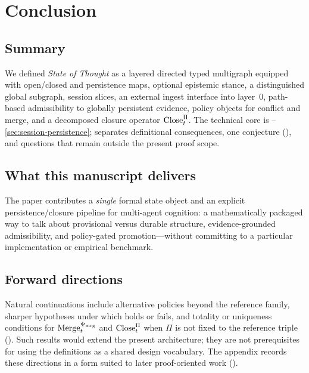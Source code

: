 \section{Conclusion}
\label{sec:conclusion}

\subsection{Summary}
\label{subsec:conc-summary}

We defined \emph{State of Thought} as a layered directed typed multigraph equipped with open/closed and persistence maps, optional epistemic stance, a distinguished global subgraph, session slices, an external ingest interface into layer~$0$, path-based admissibility to globally persistent evidence, policy objects for conflict and merge, and a decomposed closure operator $\mathrm{Close}_t^{\Pi}$.
The technical core is --\ref{sec:session-persistence};  separates definitional consequences, one conjecture (), and questions that remain outside the present proof scope.

\subsection{What this manuscript delivers}
\label{subsec:conc-delivers}

The paper contributes a \emph{single} formal state object and an explicit persistence/closure pipeline for multi-agent cognition: a mathematically packaged way to talk about provisional versus durable structure, evidence-grounded admissibility, and policy-gated promotion---without committing to a particular implementation or empirical benchmark.

\subsection{Forward directions}
\label{subsec:conc-forward}

Natural continuations include alternative policies beyond the reference family, sharper hypotheses under which  holds or fails, and totality or uniqueness conditions for $\mathrm{Merge}_t^{\Psi_{\mathrm{mrg}}}$ and $\mathrm{Close}_t^{\Pi}$ when $\Pi$ is not fixed to the reference triple ().
Such results would extend the present architecture; they are not prerequisites for using the definitions as a shared design vocabulary.
The appendix records these directions in a form suited to later proof-oriented work ().
